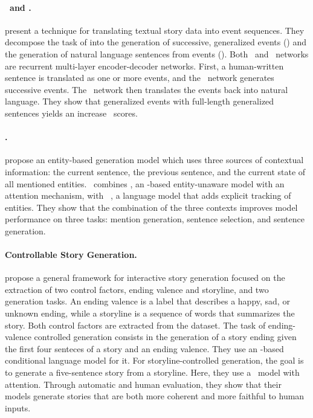 \paragraph{\etoe\ and \etos.}
\citet{martin2018event} present a technique for translating textual story data into event sequences. They decompose the task of {\asg} into the generation of successive, generalized events (\etoe) and the generation of natural language sentences from events (\etos). Both \etoe\ and \etos\ networks are recurrent multi-layer {\rnn} encoder-decoder networks. First, a human-written sentence is translated as one or more events, and the \etoe\ network generates successive events. The \etos\ network then translates the events back into natural language. They show that generalized events with full-length generalized sentences yields an increase \bleu\ scores.

\paragraph{\engen.}
\citet{clark-etal-2018-neural} propose an entity-based generation model which uses three sources of contextual information: the current sentence, the previous sentence, and the current state of all mentioned entities. \engen\ combines \stsa, an \lstm-based entity-unaware model with an attention mechanism, with \entnlm\ \citep{ji2017dynamic}, a language model that adds explicit tracking of entities. They show that the combination of the three contexts improves model performance on three tasks: mention generation, sentence selection, and sentence generation.

\paragraph{Controllable Story Generation.}
\citet{peng-etal-2018-towards} propose a general framework for interactive story generation focused on the extraction of two control factors, ending valence and storyline, and two generation tasks. An ending valence is a label that describes a happy, sad, or unknown ending, while a storyline is a sequence of words that summarizes the story. Both control factors are extracted from the {\roc} dataset. The task of ending-valence controlled generation consists in the generation of a story ending given the first four senteces of a story and an ending valence. They use an {\lstm}-based conditional language model for it. For storyline-controlled generation, the goal is to generate a five-sentence story from a storyline. Here, they use a \seqseq\ model with attention. Through automatic and human evaluation, they show that their models generate stories that are both more coherent and more faithful to human inputs.

